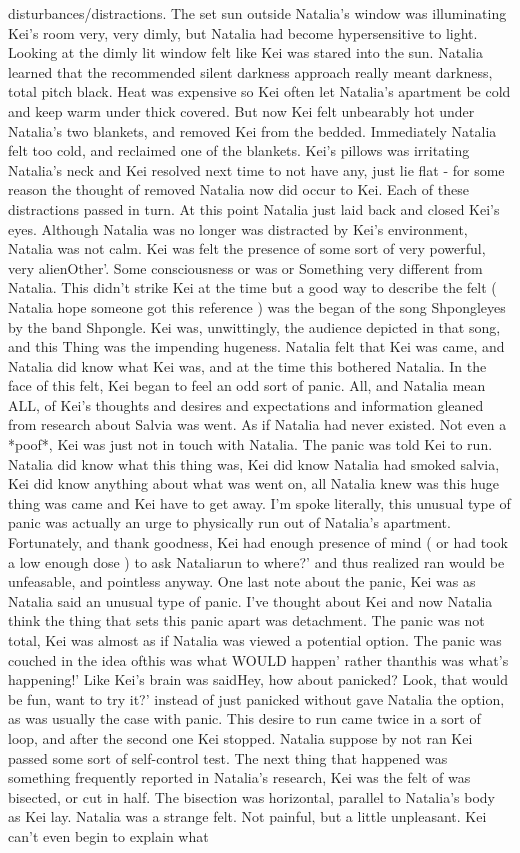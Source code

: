 \documentclass[12pt]{book}
\begin{document}
disturbances/distractions. The set sun outside Natalia's window was illuminating Kei's room very, very dimly, but Natalia had become hypersensitive to light. Looking at the dimly lit window felt like Kei was stared into the sun. Natalia learned that the recommended silent darkness approach really meant darkness, total pitch black. Heat was expensive so Kei often let Natalia's apartment be cold and keep warm under thick covered. But now Kei felt unbearably hot under Natalia's two blankets, and removed Kei from the bedded. Immediately Natalia felt too cold, and reclaimed one of the blankets. Kei's pillows was irritating Natalia's neck and Kei resolved next time to not have any, just lie flat - for some reason the thought of removed Natalia now did occur to Kei. Each of these distractions passed in turn. At this point Natalia just laid back and closed Kei's eyes. Although Natalia was no longer was distracted by Kei's environment, Natalia was not calm. Kei was felt the presence of some sort of very powerful, very alienOther'. Some consciousness or was or Something very different from Natalia. This didn't strike Kei at the time but a good way to describe the felt ( Natalia hope someone got this reference ) was the began of the song Shpongleyes by the band Shpongle. Kei was, unwittingly, the audience depicted in that song, and this Thing was the impending hugeness. Natalia felt that Kei was came, and Natalia did know what Kei was, and at the time this bothered Natalia. In the face of this felt, Kei began to feel an odd sort of panic. All, and Natalia mean ALL, of Kei's thoughts and desires and expectations and information gleaned from research about Salvia was went. As if Natalia had never existed. Not even a *poof*, Kei was just not in touch with Natalia. The panic was told Kei to run. Natalia did know what this thing was, Kei did know Natalia had smoked salvia, Kei did know anything about what was went on, all Natalia knew was this huge thing was came and Kei have to get away. I'm spoke literally, this unusual type of panic was actually an urge to physically run out of Natalia's apartment. Fortunately, and thank goodness, Kei had enough presence of mind ( or had took a low enough dose ) to ask Nataliarun to where?' and thus realized ran would be unfeasable, and pointless anyway. One last note about the panic, Kei was as Natalia said an unusual type of panic. I've thought about Kei and now Natalia think the thing that sets this panic apart was detachment. The panic was not total, Kei was almost as if Natalia was viewed a potential option. The panic was couched in the idea ofthis was what WOULD happen' rather thanthis was what's happening!' Like Kei's brain was saidHey, how about panicked? Look, that would be fun, want to try it?' instead of just panicked without gave Natalia the option, as was usually the case with panic. This desire to run came twice in a sort of loop, and after the second one Kei stopped. Natalia suppose by not ran Kei passed some sort of self-control test. The next thing that happened was something frequently reported in Natalia's research, Kei was the felt of was bisected, or cut in half. The bisection was horizontal, parallel to Natalia's body as Kei lay. Natalia was a strange felt. Not painful, but a little unpleasant. Kei can't even begin to explain what 
\end{document}
